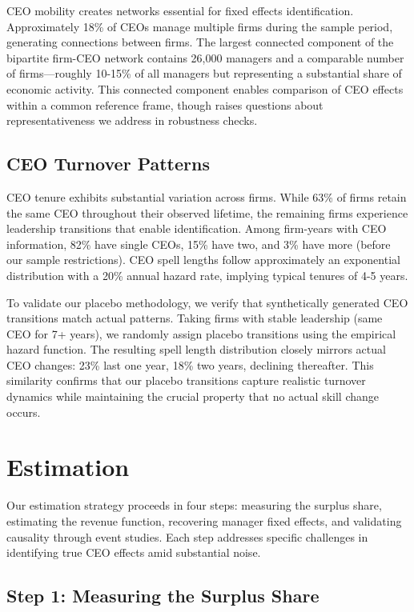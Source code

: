 \documentclass[11pt,a4paper]{article}
\begin{document}
CEO mobility creates networks essential for fixed effects identification. Approximately 18\% of CEOs manage multiple firms during the sample period, generating connections between firms. The largest connected component of the bipartite firm-CEO network contains 26,000 managers and a comparable number of firms—roughly 10-15\% of all managers but representing a substantial share of economic activity. This connected component enables comparison of CEO effects within a common reference frame, though raises questions about representativeness we address in robustness checks.

\subsection{CEO Turnover Patterns}

CEO tenure exhibits substantial variation across firms. While 63\% of firms retain the same CEO throughout their observed lifetime, the remaining firms experience leadership transitions that enable identification. Among firm-years with CEO information, 82\% have single CEOs, 15\% have two, and 3\% have more (before our sample restrictions). CEO spell lengths follow approximately an exponential distribution with a 20\% annual hazard rate, implying typical tenures of 4-5 years.

To validate our placebo methodology, we verify that synthetically generated CEO transitions match actual patterns. Taking firms with stable leadership (same CEO for 7+ years), we randomly assign placebo transitions using the empirical hazard function. The resulting spell length distribution closely mirrors actual CEO changes: 23\% last one year, 18\% two years, declining thereafter. This similarity confirms that our placebo transitions capture realistic turnover dynamics while maintaining the crucial property that no actual skill change occurs.

\section{Estimation}

Our estimation strategy proceeds in four steps: measuring the surplus share, estimating the revenue function, recovering manager fixed effects, and validating causality through event studies. Each step addresses specific challenges in identifying true CEO effects amid substantial noise.

\subsection{Step 1: Measuring the Surplus Share}
\end{document}
